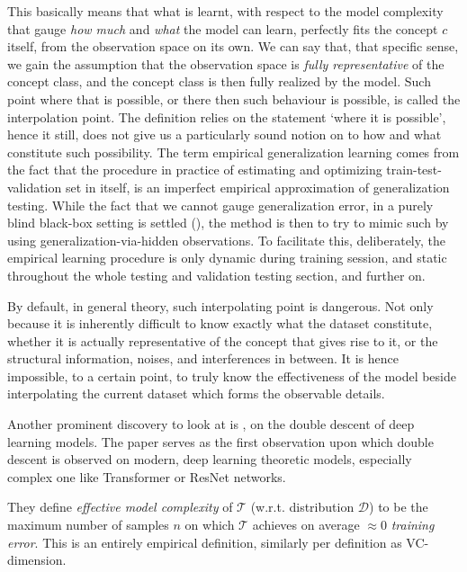 \documentclass[
  journal=largetwo,
  simfonts=false,
  year=2025,
  volume=37,
]{cup-journal}
\begin{document}
This basically means that what is learnt, with respect to the model complexity that gauge \textit{how much} and \textit{what} the model can learn, perfectly fits the concept $c$ itself, from the observation space on its own. We can say that, that specific sense, we gain the assumption that the observation space is \textit{fully representative} of the concept class, and the concept class is then fully realized by the model. Such point where that is possible, or there then such behaviour is possible, is called the interpolation point. The definition relies on the statement `where it is possible', hence it still, does not give us a particularly sound notion on to how and what constitute such possibility. The term empirical generalization learning comes from the fact that the procedure in practice of estimating and optimizing train-test-validation set in itself, is an imperfect empirical approximation of generalization testing. While the fact that we cannot gauge generalization error, in a purely blind black-box setting is settled (\cite{10.5555/2371238,10.5555/2930837,10.5555/2621980}), the method is then to try to mimic such by using generalization-via-hidden observations. To facilitate this, deliberately, the empirical learning procedure is only dynamic during training session, and static throughout the whole testing and validation testing section, and further on. 

By default, in general theory, such interpolating point is dangerous. Not only because it is inherently difficult to know exactly what the dataset constitute, whether it is actually representative of the concept that gives rise to it, or the structural information, noises, and interferences in between. It is hence impossible, to a certain point, to truly know the effectiveness of the model beside interpolating the current dataset which forms the observable details. 

Another prominent discovery to look at is \cite{nakkiran_deep_2019}, on the double descent of deep learning models. The paper serves as the first observation upon which double descent is observed on modern, deep learning theoretic models, especially complex one like Transformer or ResNet networks. 

They define \emph{effective model complexity} of $\mathcal{T}$ (w.r.t. distribution $\mathcal D$) to be the maximum number of samples $n$ on which $\mathcal{T}$ achieves on average $\approx 0$ \emph{training error}. This is an entirely empirical definition, similarly per definition as VC-dimension. 
\end{document}
